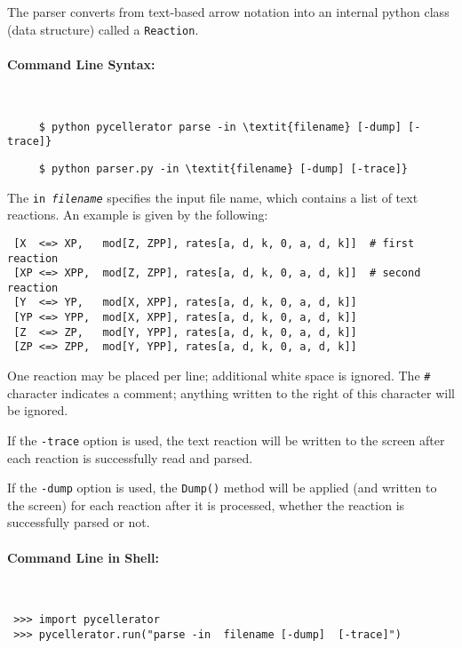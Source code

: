 The parser converts from text-based arrow notation into an internal python class (data structure) called a {\tt Reaction}.



\paragraph{Command Line Syntax:}\ \\

\begin{lstlisting}
     $ python pycellerator parse -in \textit{filename} [-dump] [-trace]}
\end{lstlisting}

\begin{lstlisting}
     $ python parser.py -in \textit{filename} [-dump] [-trace]}
\end{lstlisting}

The {\tt in \textit{filename}} specifies the input file name, which contains a list of text reactions. An example is given by the following:
\begin{lstlisting} 
 [X  <=> XP,   mod[Z, ZPP], rates[a, d, k, 0, a, d, k]]  # first reaction
 [XP <=> XPP,  mod[Z, ZPP], rates[a, d, k, 0, a, d, k]]  # second reaction
 [Y  <=> YP,   mod[X, XPP], rates[a, d, k, 0, a, d, k]] 
 [YP <=> YPP,  mod[X, XPP], rates[a, d, k, 0, a, d, k]] 
 [Z  <=> ZP,   mod[Y, YPP], rates[a, d, k, 0, a, d, k]]
 [ZP <=> ZPP,  mod[Y, YPP], rates[a, d, k, 0, a, d, k]]
\end{lstlisting}
One reaction may be placed per line; additional white space is ignored. The {\tt \#} character indicates a comment; 
anything written to the right of this character will be ignored. 

If the {\tt -trace} option is used, the text reaction will be written to the screen after each reaction is successfully read and parsed.

If the {\tt -dump} option is used, the {\tt Dump()} method will be applied (and written to the screen) for each reaction after it is processed, whether the reaction is successfully parsed or not. 

\paragraph{Command Line in Shell:}\ \\

\begin{lstlisting}
 >>> import pycellerator
 >>> pycellerator.run("parse -in  filename [-dump]  [-trace]")
\end{lstlisting}



